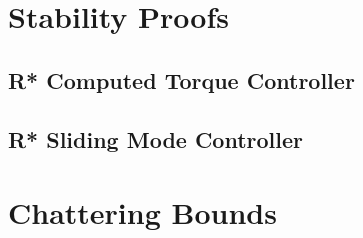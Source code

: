\newpage
\section{Stability Proofs}
\label{sec:stabproofs}

 
\subsection{R* Computed Torque Controller}
\label{sec:stabrstar}


\subsection{R* Sliding Mode Controller}
\label{sec:stabrstar}


\section{Chattering Bounds}
\label{sec:chat}


